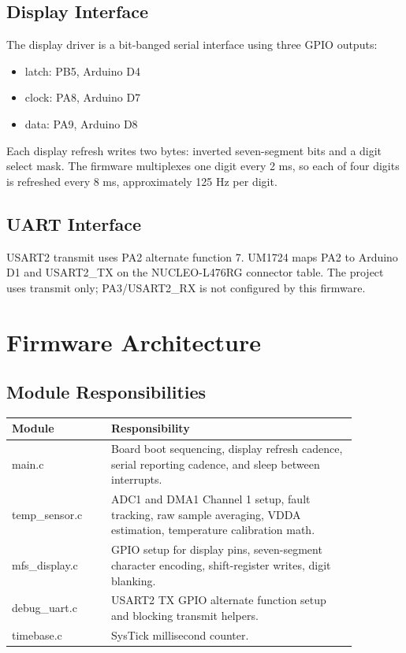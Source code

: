 \documentclass[11pt,a4paper]{article}
\begin{document}
\subsection{Display Interface}

The display driver is a bit-banged serial interface using three GPIO outputs:

\begin{itemize}[leftmargin=*]
  \item latch: PB5, Arduino D4
  \item clock: PA8, Arduino D7
  \item data: PA9, Arduino D8
\end{itemize}

Each display refresh writes two bytes: inverted seven-segment bits and a digit
select mask. The firmware multiplexes one digit every 2 ms, so each of four
digits is refreshed every 8 ms, approximately 125 Hz per digit.

\subsection{UART Interface}

USART2 transmit uses PA2 alternate function 7. UM1724 maps PA2 to Arduino D1
and USART2\_TX on the NUCLEO-L476RG connector table. The project uses transmit
only; PA3/USART2\_RX is not configured by this firmware.

\section{Firmware Architecture}

\subsection{Module Responsibilities}

\begin{longtable}{>{\ttfamily}p{0.25\linewidth}p{0.62\linewidth}}
\toprule
Module & Responsibility \\
\midrule
\endhead
main.c & Board boot sequencing, display refresh cadence, serial reporting cadence, and sleep between interrupts. \\
temp\_sensor.c & ADC1 and DMA1 Channel 1 setup, fault tracking, raw sample averaging, VDDA estimation, temperature calibration math. \\
mfs\_display.c & GPIO setup for display pins, seven-segment character encoding, shift-register writes, digit blanking. \\
debug\_uart.c & USART2 TX GPIO alternate function setup and blocking transmit helpers. \\
timebase.c & SysTick millisecond counter. \\
\bottomrule
\end{longtable}
\end{document}
